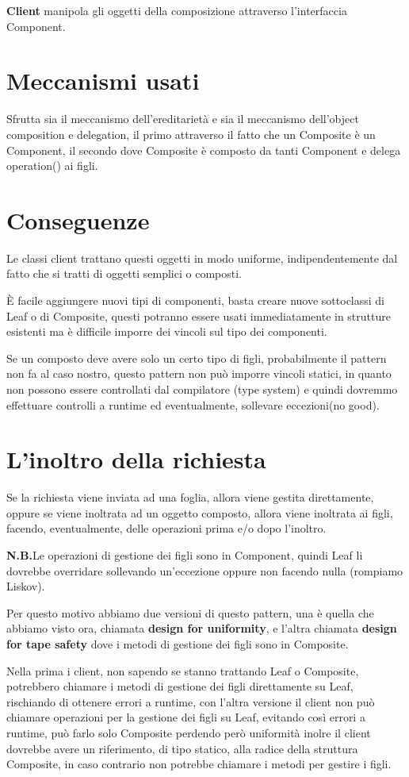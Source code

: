 \textbf{Client} manipola gli oggetti della composizione attraverso l’interfaccia Component.

\section{Meccanismi usati}
Sfrutta sia il meccanismo dell'ereditarietà e sia il meccanismo dell'object composition e delegation, il primo attraverso il fatto che un Composite è un Component, 
il secondo dove Composite è composto da tanti Component e delega operation() ai figli.

\section{Conseguenze}
Le classi client trattano questi oggetti in modo uniforme, indipendentemente dal fatto che si tratti di oggetti semplici o composti.

È facile aggiungere nuovi tipi di componenti, basta creare nuove sottoclassi di Leaf o di Composite, questi potranno essere usati immediatamente in strutture
esistenti ma è difficile imporre dei vincoli sul tipo dei componenti.

Se un composto deve avere solo un certo tipo di figli, probabilmente il pattern non fa al caso nostro, questo pattern non può imporre vincoli statici, in 
quanto non possono essere controllati dal compilatore (type system) e quindi dovremmo effettuare controlli a runtime ed eventualmente, sollevare eccezioni(no good).

\section{L'inoltro della richiesta}
Se la richiesta viene inviata ad una foglia, allora viene gestita direttamente, oppure se viene inoltrata ad un oggetto composto, allora viene inoltrata ai figli, 
facendo, eventualmente, delle operazioni prima e/o dopo l’inoltro.

\medskip
\textbf{N.B.}Le operazioni di gestione dei figli sono in Component, quindi Leaf li dovrebbe overridare sollevando un'eccezione oppure non facendo nulla 
(rompiamo Liskov).
\medskip

Per questo motivo abbiamo due versioni di questo pattern, una è quella che abbiamo visto ora, chiamata \textbf{design for uniformity}, e l'altra chiamata 
\textbf{design for tape safety} dove i metodi di gestione dei figli sono in Composite.

Nella prima i client, non sapendo se stanno trattando Leaf o Composite, potrebbero chiamare i metodi di gestione dei figli direttamente su Leaf, rischiando di 
ottenere errori a runtime, con l'altra versione il client non può chiamare operazioni per la gestione dei figli su Leaf, evitando così errori a runtime, può farlo solo 
Composite perdendo però uniformità inolre il client dovrebbe avere un riferimento, di tipo statico, alla radice della struttura Composite, in caso contrario non 
potrebbe chiamare i metodi per gestire i figli.